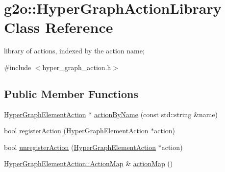 \hypertarget{classg2o_1_1_hyper_graph_action_library}{}\section{g2o\+:\+:Hyper\+Graph\+Action\+Library Class Reference}
\label{classg2o_1_1_hyper_graph_action_library}


library of actions, indexed by the action name;  




{\ttfamily \#include $<$hyper\+\_\+graph\+\_\+action.\+h$>$}

\subsection*{Public Member Functions}
\begin{DoxyCompactItemize}
\item 
\mbox{\hyperlink{classg2o_1_1_hyper_graph_element_action}{Hyper\+Graph\+Element\+Action}} $\ast$ \mbox{\hyperlink{classg2o_1_1_hyper_graph_action_library_abef8ce416dd53f2d4e8d8566abf4a00f}{action\+By\+Name}} (const std\+::string \&name)
\item 
bool \mbox{\hyperlink{classg2o_1_1_hyper_graph_action_library_a8ff09559af9efdf636ad14a011ef73ae}{register\+Action}} (\mbox{\hyperlink{classg2o_1_1_hyper_graph_element_action}{Hyper\+Graph\+Element\+Action}} $\ast$action)
\item 
bool \mbox{\hyperlink{classg2o_1_1_hyper_graph_action_library_abe4c076e6734ffa79f6d2bff07f9fad5}{unregister\+Action}} (\mbox{\hyperlink{classg2o_1_1_hyper_graph_element_action}{Hyper\+Graph\+Element\+Action}} $\ast$action)
\item 
\mbox{\hyperlink{classg2o_1_1_hyper_graph_element_action_abc889fc90ae1bbb63d90c7993777417a}{Hyper\+Graph\+Element\+Action\+::\+Action\+Map}} \& \mbox{\hyperlink{classg2o_1_1_hyper_graph_action_library_a99d123d19dda08f30ab0088d361fc640}{action\+Map}} ()
\end{DoxyCompactItemize}
